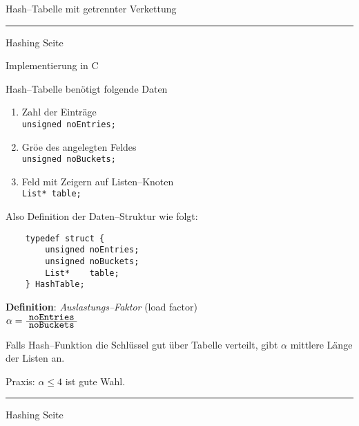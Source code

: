 
\begin{slide}{}
\normalsize

\begin{center}
Hash--Tabelle mit getrennter Verkettung
\end{center}
\vspace*{0.5cm}

\footnotesize
{}


\vspace*{\fill}
\tiny \addtocounter{mypage}{1}
\rule{17cm}{1mm}
Hashing  \hspace*{\fill} Seite 
\end{slide}


\begin{slide}{}
\normalsize

\begin{center}
Implementierung in C
\end{center}
\vspace*{0.5cm}

\footnotesize
Hash--Tabelle ben\"otigt folgende Daten
\begin{enumerate}
\item Zahl der Eintr\"age \\[0.3cm]
      \hspace*{1.3cm} \texttt{unsigned noEntries;}
\item Gr\"o\3e des angelegten Feldes \\[0.3cm]
      \hspace*{1.3cm} \texttt{unsigned noBuckets;}
\item Feld mit Zeigern auf Listen--Knoten \\[0.3cm]
      \hspace*{1.3cm} \texttt{List* table;}
\end{enumerate}
Also Definition der Daten--Struktur wie folgt:
\begin{verbatim}
    typedef struct {
        unsigned noEntries; 
        unsigned noBuckets; 
        List*    table;     
    } HashTable;
\end{verbatim}
\vspace*{0.3cm}

\textbf{Definition}: \emph{Auslastungs--Faktor} (load factor) \\[0.3cm]
\hspace*{1.3cm} $\alpha = \frac{\displaystyle\;\mathtt{noEntries}\;}{\displaystyle\;\mathtt{noBuckets}\;}$
\vspace*{0.5cm}

Falls Hash--Funktion die Schl\"ussel gut \"uber Tabelle verteilt, gibt $\alpha$
mittlere L\"ange der Listen an.

Praxis: $\alpha \leq 4$ ist gute Wahl.

\vspace*{\fill}
\tiny \addtocounter{mypage}{1}
\rule{17cm}{1mm}
Hashing  \hspace*{\fill} Seite 
\end{slide}

